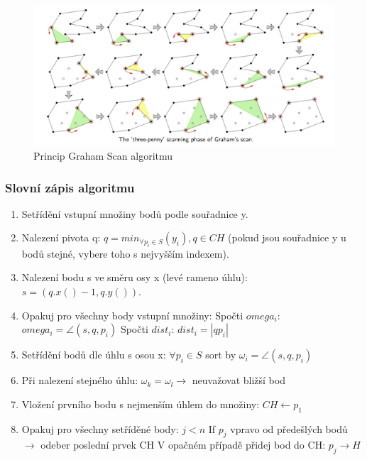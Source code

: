 \documentclass[a4paper,11pt,twoside]{article}
\begin{document}
\vspace{0.2cm}
\begin{figure}[hbt!] 
\begin{center}
\includegraphics[width=15cm]{pictures/GrahamScan.png} 
\caption[Princip Graham Scan algoritmu]{Princip Graham Scan algoritmu \cite{graham}}
\label{fig:graham}
\end{center}
\end{figure}
\vspace{-0.4cm}

\subsubsection{Slovní zápis algoritmu}
\begin{enumerate}
\item Setřídění vstupní množiny bodů podle souřadnice y.
\item Nalezení pivota q:  $ q = min_{\forall p_i \in S} (y_i), q \in CH $ (pokud jsou souřadnice y u bodů stejné, vybere toho s nejvyšším indexem).
\item Nalezení bodu s ve směru osy x (levé rameno úhlu): $ s = (q.x()-1, q.y()) $.
\item Opakuj pro všechny body vstupní množiny:
\subitem Spočti $omega_i$: $ omega_i= \angle (s, q, p_i)$ 
\subitem Spočti $dist_i$: $ dist_i= |q p_i| $
\item Setřídění bodů dle úhlu s osou x: $ {\forall p_i \in S}$ sort by $ \omega_i = \angle (s, q, p_i)$ 
\item Při nalezení stejného úhlu: $ \omega_k = \omega_l \rightarrow $ neuvažovat bližší bod
\item Vložení prvního bodu s nejmenším úhlem do množiny: $ CH \leftarrow p_1$
\item Opakuj pro všechny setříděné body: $j < n $
\subitem If $ p_j $ vpravo od předešlých bodů $ \rightarrow$ odeber poslední prvek CH
\subitem V opačném případě přidej bod do CH: $ p_{j}  \rightarrow H $
\end{enumerate}
\end{document}
